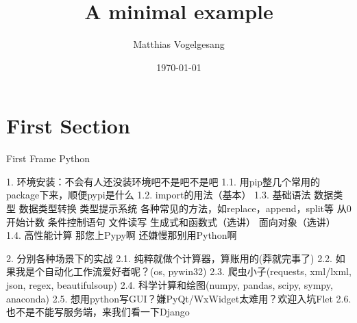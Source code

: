 \documentclass{beamer}
\title{A minimal example}
\date{\today}
\author{Matthias Vogelgesang}
\institute{Centre for Modern Beamer Themes}
\begin{document}
  \maketitle
  \section{First Section}
  \begin{frame}{First Frame}
    Python

1. 环境安装：不会有人还没装环境吧不是吧不是吧
1.1.  用pip整几个常用的package下来，顺便pypi是什么
1.2.  import的用法（基本）
1.3. 基础语法
数据类型
数据类型转换
类型提示系统
各种常见的方法，如replace，append，split等
从0开始计数
条件控制语句
文件读写
生成式和函数式（选讲）
面向对象（选讲）
1.4. 高性能计算
那您上Pypy啊
还嫌慢那别用Python啊

2.  分别各种场景下的实战
2.1. 纯粹就做个计算器，算账用的(莽就完事了)
2.2. 如果我是个自动化工作流爱好者呢？(os, pywin32)
2.3. 爬虫小子(requests, xml/lxml, json, regex, beautifulsoup)
2.4. 科学计算和绘图(numpy, pandas, scipy, sympy, anaconda)
2.5. 想用python写GUI？嫌PyQt/WxWidget太难用？欢迎入坑Flet
2.6. 也不是不能写服务端，来我们看一下Django
  \end{frame}
\end{document}
